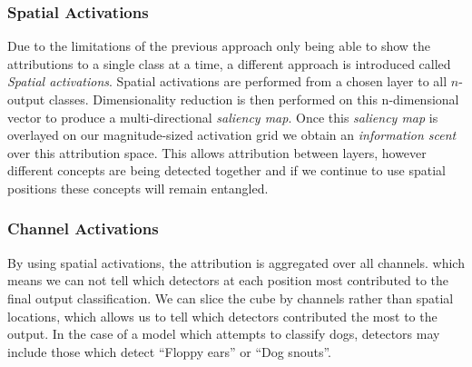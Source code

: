 \subsubsection{Spatial Activations}
Due to the limitations of the previous approach only being able to show the attributions to a single class at a time, a different approach is introduced called \emph{Spatial activations}. Spatial activations are performed from a chosen layer to all $n$-output classes. Dimensionality reduction is then performed on this n-dimensional vector to produce a multi-directional \emph{saliency map}. Once this \emph{saliency map} is overlayed on our magnitude-sized activation grid we obtain an \emph{information scent} over this attribution space. This allows attribution between layers, however different concepts are being detected together and if we continue to use spatial positions these concepts will remain entangled.

\subsubsection{Channel Activations}
By using spatial activations, the attribution is aggregated over all channels. which means we can not tell which detectors at each position most contributed to the final output classification. We can slice the cube by channels rather than spatial locations, which allows us to tell which detectors contributed the most to the output. In the case of a model which attempts to classify dogs, detectors may include those which detect ``Floppy ears'' or ``Dog snouts''.
